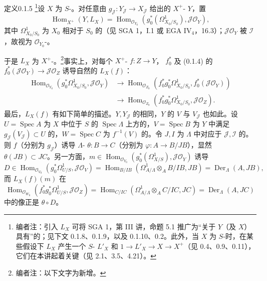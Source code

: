 \begin{SGAresult}{定义}{0.1.5}
\footnote{编者注：引入 $L_X$ 可将 SGA 1，第 III 讲，命题 5.1 推广为“关于 $Y$（及 $X$）具有”的；见下文 0.1.8、0.1.9，以及 0.1.10、0.2。此外，当 $X$ 为 $S$-时，在某些假设下 $L_X$ 产生一个 $S$- $L'_X$ 和 $1\to L'_X\to X\to X^+$（见 0.4、0.9、0.11），它们在本讲起着关键（见 2.1、3.5、4.21）。}设 $X$ 为 $S$-。对任意由 $g_{\mathcal J}:Y_{\mathcal J}\to X_{\mathcal J}$ 给出的 $X^+$- $Y$，置
\[\operatorname{Hom}_{X^+}(Y,L_X)=\operatorname{Hom}_{\mathcal O_{Y_0}}(g_0^*(\Omega^1_{X_0/S_0}),\mathcal J\mathcal O_Y),\]
其中 $\Omega^1_{X_0/S_0}$ 为 $X_0$ 相对于 $S_0$ 的（见 SGA 1，I.1 或 EGA IV$_4$，16.3）；$\mathcal J\mathcal O_Y$ 被 $\mathcal I$ ，故视为 $\mathcal O_{Y_0}$-。

于是 $L_X$ 为 $X^+$-。\footnote{编者注：以下文字为新增。}事实上，对每个 $X^+$- $f:Z\to Y$， $f_0^*$ 及 (0.1.4) 的 $f_0^*(\mathcal J\mathcal O_Y)\to\mathcal J\mathcal O_Z$ 诱导自然的 $L_X(f)$：
\[\begin{aligned}
\operatorname{Hom}_{\mathcal O_{Y_0}}(g_0^*\Omega^1_{X_0/S_0},\mathcal J\mathcal O_Y)&\longrightarrow\operatorname{Hom}_{\mathcal O_{Z_0}}(f_0^*g_0^*\Omega^1_{X_0/S_0},f_0^*(\mathcal J\mathcal O_Y))\\
&\longrightarrow\operatorname{Hom}_{\mathcal O_{Z_0}}(f_0^*g_0^*\Omega^1_{X_0/S_0},\mathcal J\mathcal O_Z).
\end{aligned}\]
最后，$L_X(f)$ 有如下简单的描述。$Y,Y_{\mathcal J}$ 的相同，$Y$ 的 $V$ 与 $V_{\mathcal J}$ 也如此。设 $U=\operatorname{Spec}A$ 为 $X$ 中位于 $S$ 的 $\operatorname{Spec}\Lambda$ 上方的，$V=\operatorname{Spec}B$ 为 $Y$ 中满足 $g_{\mathcal J}(V_{\mathcal J})\subset U$ 的，$W=\operatorname{Spec}C$ 为 $f^{-1}(V)$ 的。令 $J,I$ 为 $\Lambda$ 中对应于 $\mathcal J,\mathcal I$ 的。则 $f$（分别为 $g_{\mathcal J}$）诱导 $\Lambda$- $\theta:B\to C$（分别为 $\varphi:A\to B/JB$），显然 $\theta(JB)\subset JC$。另一方面，$m\in\operatorname{Hom}_{\mathcal O_{Y_0}}(g_0^*(\Omega^1_{X/S}),\mathcal J\mathcal O_Y)$ 诱导
\[D\in\operatorname{Hom}_{\mathcal O_{V_0}}(g_0^*\Omega^1_{U/S},\mathcal J\mathcal O_V)=\operatorname{Hom}_{B/IB}(\Omega^1_{A/\Lambda}\otimes_A B/IB,JB)=\operatorname{Der}_{\Lambda}(A,JB),\]
而 $L_X(f)(m)$ 在
\[\operatorname{Hom}_{\mathcal O_{W_0}}(f_0^*g_0^*\Omega^1_{U/S},\mathcal J\mathcal O_Z)=\operatorname{Hom}_{C/IC}(\Omega^1_{A/\Lambda}\otimes_A C/IC,JC)=\operatorname{Der}_{\Lambda}(A,JC)\]
中的像正是 $\theta\circ D$。
\end{SGAresult}
